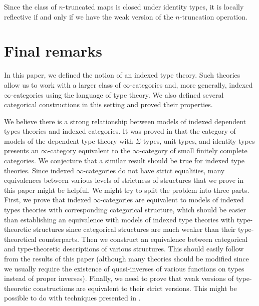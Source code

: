 \documentclass[reqno]{mscs}
\numberwithin{figure}{section}
\begin{document}
\begin{example}
Since the class of $n$-truncated maps is closed under identity types, it is locally reflective if and only if we have the weak version of the $n$-truncation operation.
\end{example}

\section{Final remarks}

In this paper, we defined the notion of an indexed type theory.
Such theories allow us to work with a larger class of $\infty$-categories and, more generally, indexed $\infty$-categories using the language of type theory.
We also defined several categorical constructions in this setting and proved their properties.

We believe there is a strong relationship between models of indexed dependent types theories and indexed categories.
It was proved in \cite{kapulkin-szumilo-fin-comp} that the category of models of the dependent type theory with $\Sigma$-types, unit types, and identity types presents an $\infty$-category equivalent to the $\infty$-category of small finitely complete categories.
We conjecture that a similar result should be true for indexed type theories.
Since indexed $\infty$-categories do not have strict equalities, many equivalences between various levels of strictness of structures that we prove in this paper might be helpful.
We might try to split the problem into three parts.
First, we prove that indexed $\infty$-categories are equivalent to models of indexed types theories with corresponding categorical structure,
which should be easier than establishing an equivalence with models of indexed type theories with type-theoretic structures since categorical structures are much weaker than their type-theoretical counterparts.
Then we construct an equivalence between categorical and type-theoretic descriptions of various structures.
This should easily follow from the results of this paper (although many theories should be modified since we usually require the existence of quasi-inverses of various functions on types instead of proper inverses).
Finally, we need to prove that weak versions of type-theoretic constructions are equivalent to their strict versions.
This might be possible to do with techniques presented in \cite{morita-equiv}.
\end{document}
